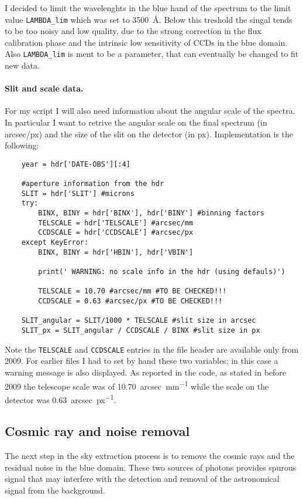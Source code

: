I decided to limit the wavelenghts in the blue hand of the spectrum to the limit value \texttt{LAMBDA\_lim} which was set to \SI{3500}{\angstrom}. Below this treshold the singal tends to be too noisy and low quality, due to the strong correction in the flux calibration phase and the intrinsic low sensitivity of CCDs in the blue domain. Also \texttt{LAMBDA\_lim} is ment to be a parameter, that can eventually be changed to fit new data.

\paragraph{Slit and scale data.} For my script I will also need information about the angular scale of the spectra. In particular I want to retrive the angular scale on the final spectrum (in arcsec/px) and the size of the slit on the detector (in px). Implementation is the following:
\begin{lstlisting}	
	year = hdr['DATE-OBS'][:4]
	
	#aperture information from the hdr
	SLIT = hdr['SLIT'] #microns
	try:
		BINX, BINY = hdr['BINX'], hdr['BINY'] #binning factors
		TELSCALE = hdr['TELSCALE'] #arcsec/mm
		CCDSCALE = hdr['CCDSCALE'] #arcsec/px
	except KeyError:
		BINX, BINY = hdr['HBIN'], hdr['VBIN']
	
		print(' WARNING: no scale info in the hdr (using defauls)')
	
		TELSCALE = 10.70 #arcsec/mm #TO BE CHECKED!!!
		CCDSCALE = 0.63 #arcsec/px #TO BE CHECKED!!!
	
	SLIT_angular = SLIT/1000 * TELSCALE #slit size in arcsec
	SLIT_px = SLIT_angular / CCDSCALE / BINX #slit size in px
\end{lstlisting}
Note the \texttt{TELSCALE} and \texttt{CCDSCALE} entries in the file header are available only from 2009. For earlier files I had to set by hand these two variables; in this case a warning message is also displayed. As reported in the code, as stated in  before 2009 the telescope scale was of \SI{10.70}{arcsec\per{mm}} while the scale on the detector was \SI{0.63}{arcsec\per{px}}.

\subsection{Cosmic ray and noise removal}
The next step in the sky extraction process is to remove the cosmic rays and the residual noise in the blue domain. These two sources of photons provides spurous signal that may interfere with the detection and removal of the astronomical signal from the background.

